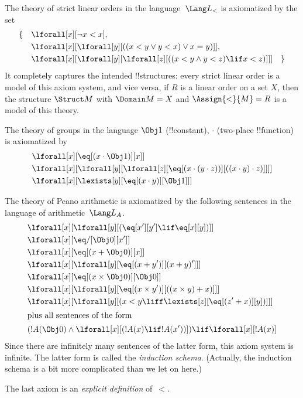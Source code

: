 

\begin{ex}
The theory of strict linear orders in the language~$\Lang L_<$ is
axiomatized by the set
\begin{align*}
\{\quad & \lforall[x][\lnot x < x], \\
& \lforall[x][\lforall[y][((x < y \lor y <
    x) \lor x = y)]], \\
& \lforall[x][\lforall[y][\lforall[z][((x < y
      \land y < z) \lif x < z)]]] \quad \}
\end{align*}
It completely captures the intended !!{structure}s: every strict
linear order is a model of this axiom system, and vice versa, if $R$
is a linear order on a set $X$, then the structure $\Struct M$ with
$\Domain M = X$ and $\Assign{<}{M} = R$ is a model of this theory.
\end{ex}

\begin{ex}
The theory of groups in the language $\Obj 1$ (!!{constant}), $\cdot$
(two-place !!{function}) is axiomatized by
\begin{align*}
& \lforall[x][\eq[(x \cdot \Obj 1)][x]]\\
& \lforall[x][\lforall[y][\lforall[z][\eq[(x \cdot (y \cdot z))][((x
          \cdot y) \cdot z)]]]]\\
& \lforall[x][\lexists[y][\eq[(x \cdot y)][\Obj 1]]]
\end{align*}
\end{ex}

\begin{ex}
The theory of Peano arithmetic is axiomatized by the following
sentences in the language of arithmetic~$\Lang L_A$.
\begin{align*}
& \lforall[x][\lforall[y][(\eq[x'][y'] \lif \eq[x][y])]]\\
& \lforall[x][\eq/[\Obj 0][x']]\\
& \lforall[x][\eq[(x + \Obj 0)][x]]\\
& \lforall[x][\lforall[y][\eq[(x + y')][(x + y)']]]\\
& \lforall[x][\eq[(x \times \Obj 0)][\Obj 0]]\\
& \lforall[x][\lforall[y][\eq[(x \times y')][((x \times y) + x)]]]\\
& \lforall[x][\lforall[y][(x < y \liff \lexists[z][\eq[(z' + x)][y])]]]\\
\intertext{plus all sentences of the form}
& (!A(\Obj 0) \land \lforall[x][(!A(x) \lif !A(x'))]) \lif \lforall[x][!A(x)]
\end{align*}
Since there are infinitely many sentences of the latter form, this
axiom system is infinite.  The latter form is called the
\emph{induction schema}. (Actually, the induction schema is a bit more
complicated than we let on here.)

The last axiom is an \emph{explicit definition} of~$<$.
\end{ex}

